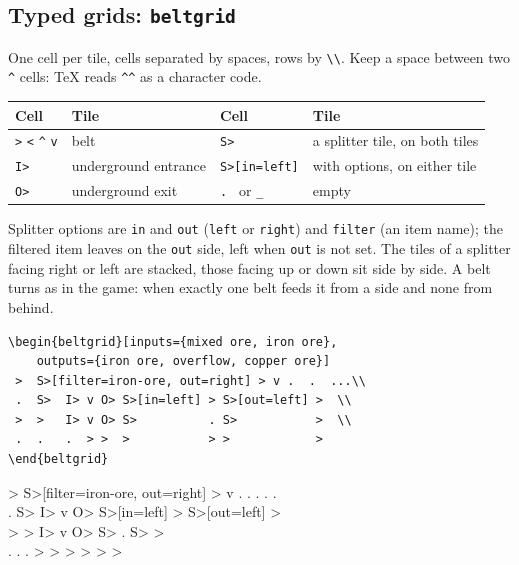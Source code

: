\documentclass[11pt]{article}
\newcommand\key[1]{\texttt{#1}}
\begin{document}
	\subsection{Typed grids: \texttt{beltgrid}}

	One cell per tile, cells separated by spaces, rows by \verb|\\|. Keep a space between two \verb|^| cells: TeX reads \verb|^^| as a character code.

	\begin{center}
		\begin{tabular}{@{}ll@{\qquad}ll@{}}
			\toprule
			Cell & Tile & Cell & Tile \\
			\midrule
			\verb|>| \verb|<| \verb|^| \verb|v| & belt & \verb|S>| & a splitter tile, on both tiles \\
			\verb|I>| & underground entrance & \verb|S>[in=left]| & with options, on either tile \\
			\verb|O>| & underground exit & \verb|. | or \verb|_| & empty \\
			\bottomrule
		\end{tabular}
	\end{center}

	Splitter options are \key{in} and \key{out} (\key{left} or \key{right}) and \key{filter} (an item name); the filtered item leaves on the \key{out} side, left when \key{out} is not set. The tiles of a splitter facing right or left are stacked, those facing up or down sit side by side. A belt turns as in the game: when exactly one belt feeds it from a side and none from behind.

	\begin{minipage}[c]{0.56\linewidth}
		\begin{Verbatim}[fontsize=\footnotesize]
\begin{beltgrid}[inputs={mixed ore, iron ore},
    outputs={iron ore, overflow, copper ore}]
 >  S>[filter=iron-ore, out=right] > v .  .  ...\\
 .  S>  I> v O> S>[in=left] > S>[out=left] >  \\
 >  >   I> v O> S>          . S>           >  \\
 .  .   .  > >  >           > >            >
\end{beltgrid}
		\end{Verbatim}
	\end{minipage}\hfill
	\begin{minipage}[c]{0.42\linewidth}
		\centering
		\begin{beltgrid}[inputs={mixed ore, iron ore}, outputs={iron ore, overflow, copper ore}, tile=4mm]
			>  S>[filter=iron-ore, out=right]  >   v  .   .           .  .           .  \\
			.  S>                              I>  v  O>  S>[in=left]  >  S>[out=left]  >  \\
			>  >                               I>  v  O>  S>           .  S>           >  \\
			.  .                               .   >  >   >            >  >            >
		\end{beltgrid}
	\end{minipage}
\end{document}
